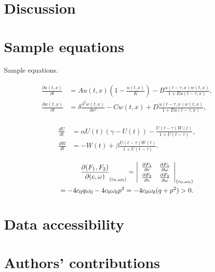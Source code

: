 \documentclass[]{rsos}%
\begin{document}
\section{Discussion}


\section*{Sample equations}

Sample equations.

\begin{align}\label{1.1}
\begin{split}
\frac{\partial u(t,x)}{\partial t} &= Au(t,x) \left(1-\frac{u(t,x)}{K}\right)-B\frac{u(t-\tau,x) w(t,x)}{1+Eu(t-\tau,x)},\\
\frac{\partial w(t,x)}{\partial t} &=\delta \frac{\partial^2w(t,x)}{\partial x^2}-Cw(t,x)+D\frac{u(t-\tau,x)w(t,x)}{1+Eu(t-\tau,x)},
\end{split}
\end{align}

\begin{align}\label{1.2}
\begin{split}
\frac{dU}{dt} &=\alpha U(t)(\gamma -U(t))-\frac{U(t-\tau)W(t)}{1+U(t-\tau)},\\
\frac{dW}{dt} &=-W(t)+\beta\frac{U(t-\tau)W(t)}{1+U(t-\tau)}.
\end{split}
\end{align}

\begin{eqnarray}
\frac{\partial(F_1,F_2)}{\partial(c,\omega)}_{(c_0,\omega_0)} = \left|
\begin{array}{ll}
\frac{\partial F_1}{\partial c} &\frac{\partial F_1}{\partial \omega} \\\noalign{\vskip3pt}
\frac{\partial F_2}{\partial c}&\frac{\partial F_2}{\partial \omega}
\end{array}\right|_{(c_0,\omega_0)}\notag\\
=-4c_0q\omega_0 -4c_0\omega_0p^2 =-4c_0\omega_0(q+p^2)>0.
\end{eqnarray}




\section*{Data accessibility}

\section*{Authors' contributions}
\end{document}
